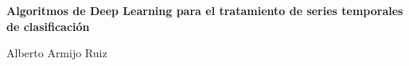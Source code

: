 \chapter*{}






\cleardoublepage
\thispagestyle{empty}

\begin{center}
{\large\bfseries Algoritmos de Deep Learning para el tratamiento de series temporales de clasificación}\\
\end{center}
\begin{center}
Alberto Armijo Ruiz\\
\end{center}

